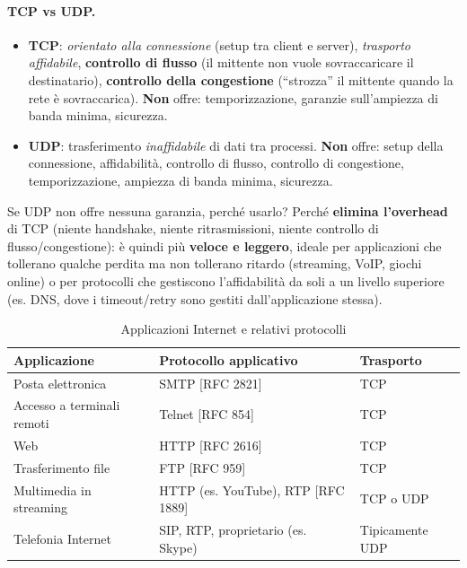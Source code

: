 \documentclass[12pt, a4paper]{article}
\begin{document}
\paragraph{TCP vs UDP.}
\begin{itemize}
    \item \textbf{TCP}: \textit{orientato alla connessione} (setup tra client e server), \textit{trasporto affidabile}, \textbf{controllo di flusso} (il mittente non vuole sovraccaricare il destinatario), \textbf{controllo della congestione} (``strozza'' il mittente quando la rete è sovraccarica). \textbf{Non} offre: temporizzazione, garanzie sull'ampiezza di banda minima, sicurezza.
    \item \textbf{UDP}: trasferimento \textit{inaffidabile} di dati tra processi. \textbf{Non} offre: setup della connessione, affidabilità, controllo di flusso, controllo di congestione, temporizzazione, ampiezza di banda minima, sicurezza.
\end{itemize}

\begin{tcolorbox}[colback=cyan!5, colframe=blue!40!black, title=\textbf{Spunto per l'orale -- perché esiste UDP?}]
Se UDP non offre nessuna garanzia, perché usarlo? Perché \textbf{elimina l'overhead} di TCP (niente handshake, niente ritrasmissioni, niente controllo di flusso/congestione): è quindi più \textbf{veloce e leggero}, ideale per applicazioni che tollerano qualche perdita ma non tollerano ritardo (streaming, VoIP, giochi online) o per protocolli che gestiscono l'affidabilità da soli a un livello superiore (es. DNS, dove i timeout/retry sono gestiti dall'applicazione stessa).
\end{tcolorbox}

\begin{table}[H]
\centering
\caption{Applicazioni Internet e relativi protocolli}
\small
\begin{tabular}{lll}
\toprule
\textbf{Applicazione} & \textbf{Protocollo applicativo} & \textbf{Trasporto} \\
\midrule
Posta elettronica & SMTP [RFC 2821] & TCP \\
Accesso a terminali remoti & Telnet [RFC 854] & TCP \\
Web & HTTP [RFC 2616] & TCP \\
Trasferimento file & FTP [RFC 959] & TCP \\
Multimedia in streaming & HTTP (es. YouTube), RTP [RFC 1889] & TCP o UDP \\
Telefonia Internet & SIP, RTP, proprietario (es. Skype) & Tipicamente UDP \\
\bottomrule
\end{tabular}
\end{table}
\end{document}
